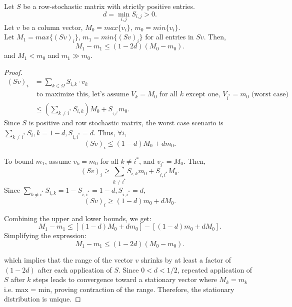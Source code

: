 \documentclass[a4paper]{article}
\begin{document}
\begin{lemma}
  Let $S$ be a row-stochastic matrix with strictly positive entries. 
   \[
  d = \min_{i,j} S_{i,j} > 0
  .\] 
  Let $v$ be a column vector, $M_0 = max \{v_i\} $, $m_0 = min \{v_i\} $. \\
  Let $M_1 = max \{(Sv)_{i}\}$, $m_1 = min \{(Sv)_{i}\} $ for all entries in  $Sv$.  Then,
  \[
  M_1 - m_1 \leq (1-2d) (M_0 - m_0)
  .\] 
  and $M_1 < m_0$ and $m_1 \gg m_0$.

  \noindent\hrulefill

  \begin{proof}
    \begin{align*}
      (Sv)_{i} &= \sum_{k \in \Omega} S_{i,k}\cdot v_k \\
               &\text{ to maximize this, let's assume $V_k = M_0$ for all  $k$ except one,  $V_{i^{*}} =m_0$ (worst case)} \\
               &\leq \left( \sum_{k \neq i^{*}} S_{i,k} \right)M_0 + S_{_{i, i^{*}}} m_0  
    .\end{align*}
    Since $S$ is positive and row stochastic matrix, the worst case scenario is  $\sum_{k \neq i^{*}} S_i,k = 1-d, S_{i,i^{*}} = d$. Thus, $\forall i$,
    \[
      (Sv)_{i} \leq (1-d)M_0 + d m_0
    .\] 


To bound \( m_1 \), assume \( v_k = m_0 \) for all \( k \neq i^* \), and \( v_{i^*} = M_0 \). Then, 
\[
(Sv)_i \geq \sum_{k \neq i^*} S_{i,k} m_0 + S_{i,i^*} M_0.
\]
Since \( \sum_{k \neq i^*} S_{i,k} = 1 - S_{i,i^*} = 1-d, S_{i,i^{*}}=d\),
\[
(Sv)_i \geq (1 - d) m_0 + d M_0.
\]

Combining the upper and lower bounds, we get:
\[
M_1 - m_1 \leq \left[ (1 - d) M_0 + d m_0 \right] - \left[ (1 - d) m_0 + d M_0 \right].
\]
Simplifying the expression:
\[
M_1 - m_1 \leq (1 - 2d)(M_0 - m_0).
\]

which implies that the range of the vector \( v \) shrinks by at least a factor of \( (1 - 2d) \) after each application of \( S \). Since \( 0 < d < 1/2 \), repeated application of \( S \) after $k$ steps leads to convergence toward a stationary vector where \( M_k = m_k \) i.e. max = min, proving contraction of the range. Therefore, the stationary distribution is unique.
  \end{proof}
\end{lemma}
\end{document}
